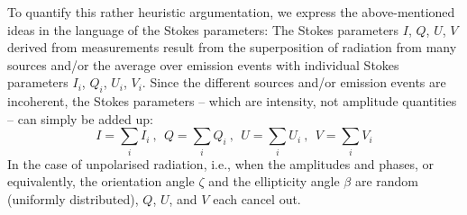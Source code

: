 To quantify this rather heuristic argumentation, we express the
above-mentioned ideas in the language of the Stokes parameters: The
Stokes parameters $I$, $Q$, $U$, $V$ derived from measurements result
from the superposition of radiation from many sources and/or the
average over emission events with individual Stokes parameters $I_i$,
$Q_i$, $U_i$, $V_i$.  Since the different sources and/or emission events are
incoherent, the Stokes parameters -- which are intensity, not
amplitude quantities -- can simply be added up:
\begin{equation}
  \label{eq:polarization:summed_stokes}
  I = \sum_i I_i \: \mbox{, }\; 
  Q = \sum_i Q_i \: \mbox{, }\; 
  U = \sum_i U_i \: \mbox{, }\; 
  V = \sum_i V_i
\end{equation}
In the case of unpolarised radiation, i.e., when the amplitudes and
phases, or equivalently, the orientation angle $\zeta$ and the
ellipticity angle $\beta$ are random (uniformly distributed), 
$Q$, $U$, and $V$
each cancel out.


